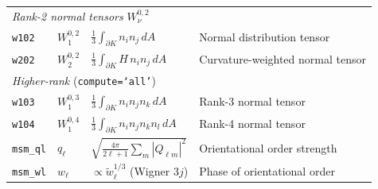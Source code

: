 \documentclass[times, twoside, watermark]{zHenriquesLab-StyleBioRxiv}
\begin{document}
{\begin{table}[!ht]
\begin{tabular}{llll}
\hline
\multicolumn{4}{l}{\textit{Rank-2 normal tensors} $W_\nu^{0,2}$} \\
\texttt{w102} & $W_1^{0,2}$ & $\frac{1}{3}\int_{\partial K} n_i n_j\,dA$ & Normal distribution tensor \\
\texttt{w202} & $W_2^{0,2}$ & $\frac{1}{3}\int_{\partial K} H\,n_i n_j\,dA$ & Curvature-weighted normal tensor \\
\hline
\multicolumn{4}{l}{\textit{Higher-rank} (\texttt{compute=`all'})} \\
\texttt{w103} & $W_1^{0,3}$ & $\frac{1}{3}\int_{\partial K} n_i n_j n_k\,dA$ & Rank-3 normal tensor \\
\texttt{w104} & $W_1^{0,4}$ & $\frac{1}{3}\int_{\partial K} n_i n_j n_k n_l\,dA$ & Rank-4 normal tensor \\
\texttt{msm\_ql} & $q_\ell$ & $\sqrt{\frac{4\pi}{2\ell+1}\sum_m|Q_{\ell m}|^2}$ & Orientational order strength \\
\texttt{msm\_wl} & $w_\ell$ & $\propto\tilde{w}_\ell^{1/3}$ (Wigner $3j$) & Phase of orientational order \\
\hline
\end{tabular}
\end{table}
}
\end{document}
